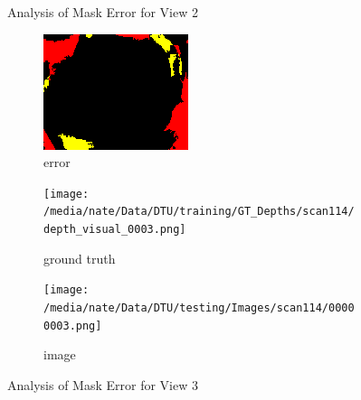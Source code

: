 \documentclass{article}
\begin{document}
\begin{figure}
\begin{subfigure}{0.3\textwidth}
		\label{fig:img2}
	\end{subfigure}
	\hfill
	\caption{Analysis of Mask Error for View 2}
	\label{fig:error_analys2}
\end{figure}\begin{figure}
	\centering
	\begin{subfigure}{0.3\textwidth}
		\centering
		\includegraphics[width=\textwidth]{./output/003_error.png}
		\caption{error}
		\label{fig:error3}
	\end{subfigure}
	\hfill
	\centering
	\begin{subfigure}{0.3\textwidth}
		\centering
		\texttt{[image: /media/nate/Data/DTU/training/GT\_Depths/scan114/depth\_visual\_0003.png]}
		\caption{ground truth}
		\label{fig:gt3}
	\end{subfigure}
	\hfill
	\centering
	\begin{subfigure}{0.3\textwidth}
		\centering
		\texttt{[image: /media/nate/Data/DTU/testing/Images/scan114/00000003.png]}
		\caption{image}
		\label{fig:img3}
	\end{subfigure}
	\hfill
	\caption{Analysis of Mask Error for View 3}
	\label{fig:error_analys3}
\end{figure}\begin{figure}
	\centering
	\begin{subfigure}{0.3\textwidth}
		\centering

\end{subfigure}
\end{figure}
\end{document}
